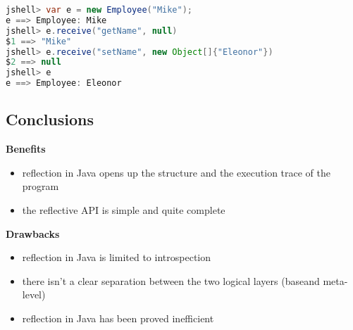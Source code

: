 \begin{lstlisting}[language=Java]
jshell> var e = new Employee("Mike");
e ==> Employee: Mike
jshell> e.receive("getName", null)
$1 ==> "Mike"
jshell> e.receive("setName", new Object[]{"Eleonor"})
$2 ==> null
jshell> e
e ==> Employee: Eleonor
\end{lstlisting}

\subsection{Conclusions}

\textbf{Benefits}
\begin{itemize}
	\item reflection in Java opens up the structure and the execution trace of the program
	\item the reflective API is simple and quite complete
\end{itemize}

\textbf{Drawbacks}
\begin{itemize}
	\item reflection in Java is limited to introspection
	\item there isn’t a clear separation between the two logical layers (baseand meta-level)
	\item reflection in Java has been proved inefficient
\end{itemize}
